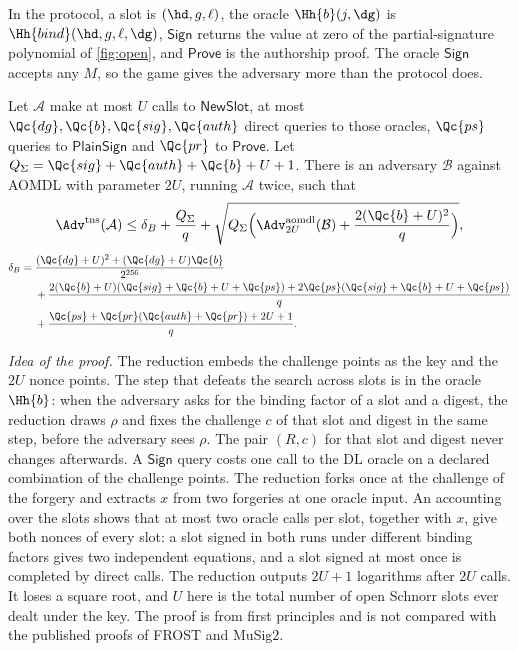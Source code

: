 In the protocol, a slot is $(\hd, g, \ell)$, the oracle $\Hh{b}(j, \dg)$ is $\Hh{bind}(\hd, g, \ell, \dg)$, $\mathsf{Sign}$ returns the value at zero of the partial-signature polynomial of \cref{fig:open}, and $\mathsf{Prove}$ is the authorship proof. The oracle $\mathsf{Sign}$ accepts any $M$, so the game gives the adversary more than the protocol does.

\begin{theorem}\label{thm:tns}
Let $\mathcal{A}$ make at most $U$ calls to $\mathsf{NewSlot}$, at most $\Qc{dg}, \Qc{b}, \Qc{sig}, \Qc{auth}$ direct queries to those oracles, $\Qc{ps}$ queries to $\mathsf{PlainSign}$ and $\Qc{pr}$ to $\mathsf{Prove}$. Let $Q_{\Sigma} = \Qc{sig} + \Qc{auth} + \Qc{b} + U + 1$. There is an adversary $\mathcal{B}$ against AOMDL with parameter $2U$, running $\mathcal{A}$ twice, such that
\[
  \Adv^{\mathrm{tns}}(\mathcal{A}) \le \delta_B + \frac{Q_{\Sigma}}{q} + \sqrt{Q_{\Sigma}\Bigl(\Adv^{\mathrm{aomdl}}_{2U}(\mathcal{B}) + \frac{2(\Qc{b} + U)^2}{q}\Bigr)} ,
\]
\begin{align*}
  \delta_B ={}& \frac{(\Qc{dg} + U)^2 + (\Qc{dg} + U)\Qc{b}}{2^{256}} \\
  &+ \frac{2(\Qc{b} + U)(\Qc{sig} + \Qc{b} + U + \Qc{ps}) + 2\Qc{ps}(\Qc{sig} + \Qc{b} + U + \Qc{ps})}{q} \\
  &+ \frac{\Qc{ps} + \Qc{pr}(\Qc{auth} + \Qc{pr}) + 2U + 1}{q} .
\end{align*}
\end{theorem}

\emph{Idea of the proof.} The reduction embeds the challenge points as the key and the $2U$ nonce points. The step that defeats the search across slots is in the oracle $\Hh{b}$: when the adversary asks for the binding factor of a slot and a digest, the reduction draws $\rho$ and fixes the challenge $c$ of that slot and digest in the same step, before the adversary sees $\rho$. The pair $(R, c)$ for that slot and digest never changes afterwards. A $\mathsf{Sign}$ query costs one call to the $\mathrm{DL}$ oracle on a declared combination of the challenge points. The reduction forks once at the challenge of the forgery and extracts $x$ from two forgeries at one oracle input. An accounting over the slots shows that at most two oracle calls per slot, together with $x$, give both nonces of every slot: a slot signed in both runs under different binding factors gives two independent equations, and a slot signed at most once is completed by direct calls. The reduction outputs $2U + 1$ logarithms after $2U$ calls. It loses a square root, and $U$ here is the total number of open Schnorr slots ever dealt under the key. The proof is from first principles and is not compared with the published proofs of FROST and MuSig2.

